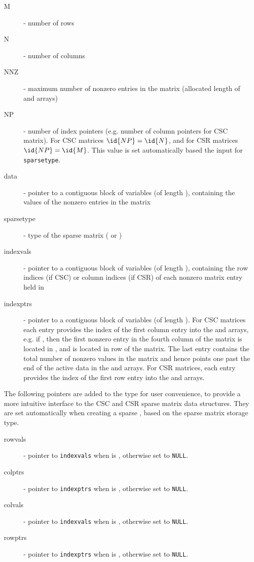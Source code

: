\begin{description}
  \item[M]  - number of rows
  \item[N]  - number of columns
  \item[NNZ]  - maximum number of nonzero entries in the matrix
    (allocated length of  and  arrays)
  \item[NP]  - number of index pointers (e.g. number of column pointers for 
    CSC matrix). For CSC matrices $\id{NP}=\id{N}$, and for CSR
    matrices $\id{NP}=\id{M}$. This value is set automatically based
    the input for \verb|sparsetype|.
  \item[data]  - pointer to a contiguous block of 
    variables (of length ), containing the values of the
    nonzero entries in the matrix
  \item[sparsetype]  - type of the sparse matrix ( or )
  \item[indexvals] - pointer to a contiguous block of  variables
    (of length ), containing the row indices (if CSC) or column
   indices (if CSR) of each nonzero matrix entry held in 
  \item[indexptrs]  - pointer to a contiguous block of 
    variables (of length ). For CSC matrices each 
    entry provides the index of the first column entry into the 
     and  arrays, e.g. if , then 
    the first nonzero entry in the fourth column of the matrix is 
    located in , and is located in row  of the 
    matrix.  The last entry contains the total number of nonzero values in 
    the matrix and hence points one past the end of the active data in the 
     and  arrays. For CSR matrices, each entry provides 
    the index of the first row entry into the  and  
    arrays.
\end{description}
\noindent The following pointers are added to the  type for
  user convenience, to provide a more intuitive interface to the CSC
  and CSR sparse matrix data structures. They are set automatically
  when creating a sparse {\sunmatrix}, based on the sparse matrix storage
  type.  
\begin{description}
  \item[rowvals] - pointer to \verb|indexvals| when  is ,
    otherwise set to \verb|NULL|.
  \item[colptrs] - pointer to \verb|indexptrs| when  is ,
    otherwise set to \verb|NULL|.
  \item[colvals] - pointer to \verb|indexvals| when  is ,
    otherwise set to \verb|NULL|.
  \item[rowptrs] - pointer to \verb|indexptrs| when  is ,
    otherwise set to \verb|NULL|.
\end{description}
